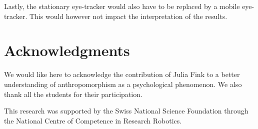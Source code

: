 \documentclass[lettersize, noapacite, twoside, HRI]{apa_HRI}
\begin{document}
Lastly, the stationary eye-tracker would also have to be replaced by a mobile
eye-tracker. This would however not impact the interpretation of the results.

\section*{Acknowledgments}

We would like here to acknowledge the contribution of Julia Fink to a better
understanding of anthropomorphism as a psychological phenomenon. We also thank
all the students for their participation.

This research was supported by the Swiss National Science Foundation through the
National Centre of Competence in Research Robotics.





%
%
\end{document}
